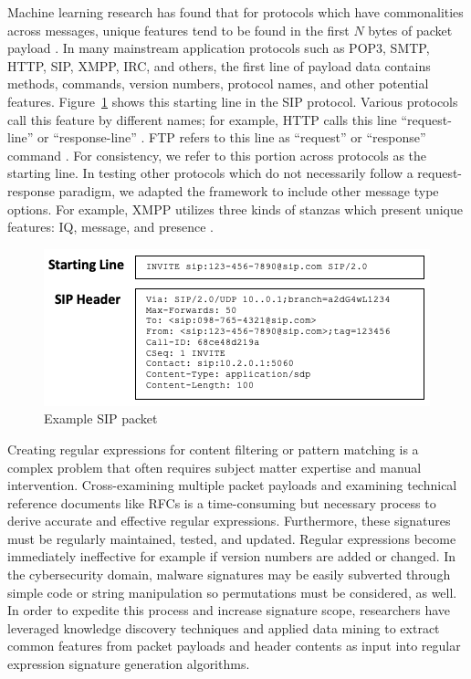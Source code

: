 Machine learning research has found that for protocols which have commonalities across messages, unique features tend to be found in the first $N$ bytes of packet payload \cite{wangxiang}. In many mainstream application protocols such as POP3, SMTP, HTTP, SIP, XMPP, IRC, and others, the first line of payload data contains methods, commands, version numbers, protocol names, and other potential features. Figure~\ref{f:sippacket} shows this starting line in the SIP protocol. Various protocols call this feature by different names; for example, HTTP calls this line ``request-line'' or ``response-line'' \cite{rfc2616}. FTP refers to this line as ``request'' or ``response'' command \cite{rfc959}. For consistency, we refer to this portion across protocols as the starting line. In testing other protocols which do not necessarily follow a request-response paradigm, we adapted the framework to include other message type options. For example, XMPP utilizes three kinds of stanzas which present unique features: IQ, message, and presence \cite{rfc6120}.

\begin{figure}[hbt!]
  \begin{center}
    \includegraphics[width=0.7\columnwidth]{chapters/3/img/SIPpacket.png}
    \caption{Example SIP packet}
    \label{f:sippacket}
  \end{center}
\end{figure}


Creating regular expressions for content filtering or pattern matching  is a complex problem that often requires subject matter expertise and manual intervention. Cross-examining multiple packet payloads and examining technical reference documents like RFCs is a time-consuming but necessary process to derive accurate and effective regular expressions. Furthermore, these signatures must be regularly maintained, tested, and updated. Regular expressions become immediately ineffective for example if version numbers are added or changed. In the cybersecurity domain, malware signatures may be easily subverted through simple code or string manipulation so permutations must be considered, as well. In order to expedite this process and increase signature scope, researchers have leveraged knowledge discovery techniques and applied data mining to extract common features from packet payloads and header contents as input into regular expression signature generation algorithms.
